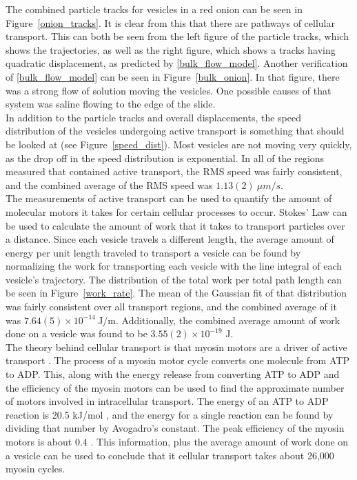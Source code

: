 \documentclass[11pt,letterpaper]{article}
\begin{document}
The combined particle tracks for vesicles in a red onion can be seen in
Figure~\ref{onion_tracks}. It is clear from this that there are pathways of
cellular transport. This can both be seen from the left figure of the particle
tracks, which shows the trajectories, as well as the right figure, which shows a
tracks having quadratic displacement, as predicted by \eqref{bulk_flow_model}.
Another verification of \eqref{bulk_flow_model} can be seen in
Figure~\ref{bulk_onion}. In that figure, there was a strong flow of solution
moving the vesicles. One possible causes of that system was saline flowing to
the edge of the slide.\\

In addition to the particle tracks and overall displacements, the speed
distribution of the vesicles undergoing active transport is something that
should be looked at (see Figure~\ref{speed_dist}). Most vesicles are not moving
very quickly, as the drop off in the speed distribution is exponential. In all
of the regions measured that contained active transport, the RMS speed was
fairly consistent, and the combined average of the RMS speed was
$1.13(2)\ \mu m/s$.\\

The measurements of active transport can be used to quantify the amount of
molecular motors it takes for certain cellular processes to occur. Stokes' Law
can be used to calculate the amount of work that it takes to transport particles
over a distance. Since each vesicle travels a different length, the average
amount of energy per unit length traveled to transport a vesicle can be found by
normalizing the work for transporting each vesicle with the line integral of
each vesicle's trajectory. The distribution of the total work per total path
length can be seen in Figure~\ref{work_rate}. The mean of the Gaussian fit of
that distribution was fairly consistent over all transport regions, and the
combined average of it was $7.64(5) \times 10^{-14}\ \text{J/m}$. Additionally,
the combined average amount of work done on a vesicle was found to be
$3.55(2) \times 10^{-19}$ J.\\

The theory behind cellular transport is that myosin motors are a driver of
active transport \cite{Motors}. The process of a myosin motor cycle converts one
molecule from ATP to ADP. This, along with the energy release from converting
ATP to ADP and the efficiency of the myosin motors can be used to find the
approximate number of motors involved in intracellular transport. The energy of
an ATP to ADP reaction is 20.5 kJ/mol \cite{ATPADP}, and the energy for a single
reaction can be found by dividing that number by Avogadro's constant. The peak
efficiency of the myosin motors is about 0.4 \cite{Myosin}. This information,
plus the average amount of work done on a vesicle can be used to conclude that
it cellular transport takes about 26,000 myosin cycles.\\
\end{document}
